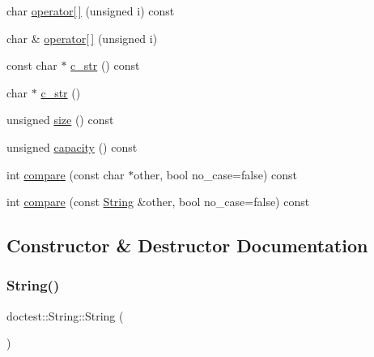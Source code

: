\begin{DoxyCompactItemize}
\item 
char \mbox{\hyperlink{classdoctest_1_1_string_adf69290bc23e8c7bf60a9bcf765ebc10}{operator\mbox{[}$\,$\mbox{]}}} (unsigned i) const
\item 
char \& \mbox{\hyperlink{classdoctest_1_1_string_acd37c72485c1277fc673f6b328138b40}{operator\mbox{[}$\,$\mbox{]}}} (unsigned i)
\item 
const char $\ast$ \mbox{\hyperlink{classdoctest_1_1_string_a607c6977b193fecf29622110e6081625}{c\+\_\+str}} () const
\item 
char $\ast$ \mbox{\hyperlink{classdoctest_1_1_string_a35df67f11652bcc568ad3af470c344c0}{c\+\_\+str}} ()
\item 
unsigned \mbox{\hyperlink{classdoctest_1_1_string_a9fbc7b09f1660b236f12fc2adce6183d}{size}} () const
\item 
unsigned \mbox{\hyperlink{classdoctest_1_1_string_adad8703f08950d173d2cb1426391fcdf}{capacity}} () const
\item 
int \mbox{\hyperlink{classdoctest_1_1_string_aef87d1f106d32d8c31af87335b44164d}{compare}} (const char $\ast$other, bool no\+\_\+case=false) const
\item 
int \mbox{\hyperlink{classdoctest_1_1_string_adb57becb56e054d981e7c2b967a7e359}{compare}} (const \mbox{\hyperlink{classdoctest_1_1_string}{String}} \&other, bool no\+\_\+case=false) const
\end{DoxyCompactItemize}


\subsection{Constructor \& Destructor Documentation}
\mbox{\label{classdoctest_1_1_string_ab18d26f6c9e728c2fac77a501b8ca5f5}} 
\subsubsection{\texorpdfstring{String()}{String()}\hspace{0.1cm}{\footnotesize\ttfamily [1/5]}}
{\footnotesize\ttfamily doctest\+::\+String\+::\+String (\begin{DoxyParamCaption}{ }\end{DoxyParamCaption})}

\mbox{\label{classdoctest_1_1_string_af5dce5deeb8f25a4866efdff75e92975}} 

